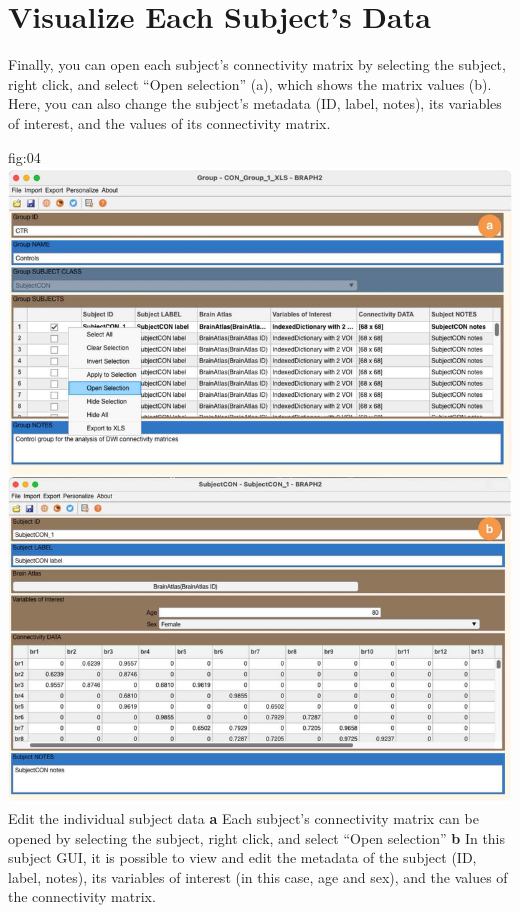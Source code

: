 \documentclass[justified]{tufte-handout}
\begin{document}
\section{Visualize Each Subject's Data}

Finally, you can open each subject's connectivity matrix by selecting the subject, right click, and select ``Open selection'' (a), which shows the matrix values (b). Here, you can also change the subject's metadata (ID, label, notes), its variables of interest, and the values of its connectivity matrix.

	{fig:04}
	{\includegraphics{fig04.jpg}
	}
	{Edit the individual subject data}
	{
	{\bf a}  Each subject's connectivity matrix can be opened by selecting the subject, right click, and select ``Open selection''
	{\bf b} In this subject GUI, it is possible to view and edit the metadata of the subject (ID, label, notes), its variables of interest (in this case, age and sex), and the values of the connectivity matrix. 
	}
\end{document}
